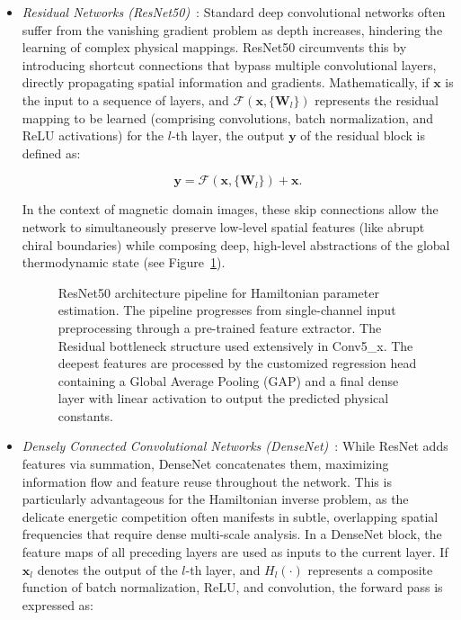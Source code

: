 \documentclass[final,5p,times,twocolumn]{elsarticle}
\begin{document}
\begin{itemize}

\item[--] \emph{Residual Networks (ResNet50)}~\cite{koonce2021resnet}: Standard deep convolutional networks often suffer from the vanishing gradient problem as depth increases, hindering the learning of complex physical mappings. ResNet50 circumvents this by introducing shortcut connections that bypass multiple convolutional layers, directly propagating spatial information and gradients. Mathematically, if $\mathbf{x}$ is the input to a sequence of layers, and $\mathcal{F}(\mathbf{x}, \{\mathbf{W}_l\})$ represents the residual mapping to be learned (comprising convolutions, batch normalization, and ReLU activations) for the $l$-th layer, the output $\mathbf{y}$ of the residual block is defined as:

\begin{equation}\label{eq:ResNet}
\mathbf{y} = \mathcal{F}(\mathbf{x}, \{\mathbf{W}_l\}) + \mathbf{x}.
\end{equation}

In the context of magnetic domain images, these skip connections allow the network to simultaneously preserve low-level spatial features (like abrupt chiral boundaries) while composing deep, high-level abstractions of the global thermodynamic state (see Figure~\ref{fig:resnet_implementation}).

\begin{figure}[t!]
    \centering
    \resizebox{\linewidth}{!}{
    }
\caption{ResNet50 architecture pipeline for Hamiltonian parameter estimation. The pipeline progresses from single-channel input preprocessing through a pre-trained feature extractor. The Residual bottleneck structure used extensively in Conv5\_x. The deepest features are processed by the customized regression head containing a Global Average Pooling (GAP) and a final dense layer with linear activation to output the predicted physical constants.}
\label{fig:resnet_implementation}
\end{figure}

\item[--] \emph{Densely Connected Convolutional Networks (DenseNet)}~\cite{huang2017densely}: While ResNet adds features via summation, DenseNet concatenates them, maximizing information flow and feature reuse throughout the network. This is particularly advantageous for the Hamiltonian inverse problem, as the delicate energetic competition often manifests in subtle, overlapping spatial frequencies that require dense multi-scale analysis. In a DenseNet block, the feature maps of all preceding layers are used as inputs to the current layer. If $\mathbf{x}_l$ denotes the output of the $l$-th layer, and $H_l(\cdot)$ represents a composite function of batch normalization, ReLU, and convolution, the forward pass is expressed as:


\end{itemize}
\end{document}
